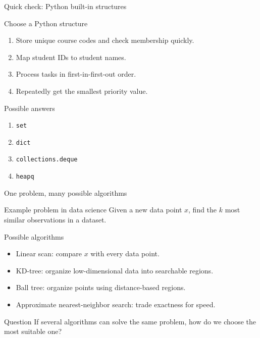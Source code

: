 \documentclass[aspectratio=169]{beamer}
\begin{document}
\begin{frame}{Quick check: Python built-in structures}
  \small

  \begin{block}{Choose a Python structure}
    \begin{enumerate}
      \item Store unique course codes and check membership quickly.
      \item Map student IDs to student names.
      \item Process tasks in first-in-first-out order.
      \item Repeatedly get the smallest priority value.
    \end{enumerate}
  \end{block}

  \begin{exampleblock}{Possible answers}
    \begin{enumerate}
      \item \texttt{set}
      \item \texttt{dict}
      \item \texttt{collections.deque}
      \item \texttt{heapq}
    \end{enumerate}
  \end{exampleblock}
\end{frame}

\begin{frame}{One problem, many possible algorithms}
  \small

  \begin{block}{Example problem in data science}
    Given a new data point $x$, find the $k$ most similar observations in a dataset.
  \end{block}

  \begin{exampleblock}{Possible algorithms}
    \begin{itemize}
      \item Linear scan: compare $x$ with every data point.
      \item KD-tree: organize low-dimensional data into searchable regions.
      \item Ball tree: organize points using distance-based regions.
      \item Approximate nearest-neighbor search: trade exactness for speed.
    \end{itemize}
  \end{exampleblock}

  \begin{alertblock}{Question}
    If several algorithms can solve the same problem, how do we choose the most suitable one?
  \end{alertblock}
\end{frame}
\end{document}
